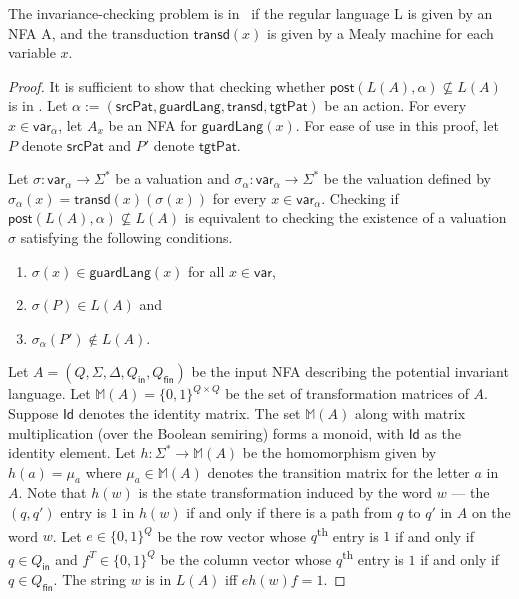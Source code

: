 \documentclass[12pt, a4paper]{article}
\newcommand{\var}{\textsf{var}}
\newcommand{\T}{\textsf{transd}}
\newcommand{\post}{\textsf{post}}
\newcommand{\ssub}{\sigma} %
\newcommand{\spat}{\textsf{srcPat}}
\newcommand{\tpat}{\textsf{tgtPat}}
\newcommand{\guardL}{\textsf{guardLang}}
\newcommand{\alphabet}{\Sigma}
\renewcommand{\aut}{A}
\newcommand{\autinitial}{Q_\textsf{in}}
\newcommand{\auttrans}{\Delta}
\newcommand{\autfin}{Q_\textsf{fin}}
\newcommand{\Aut}{\aut}
\newcommand{\action}{\alpha}
\newcommand{\matrixSet}{\mathbb M}
\newcommand{\Id}{\textsf{Id}}
\begin{document}
\begin{theorem}
	The invariance-checking problem is in \psp\ if the regular language L is given by an NFA A, and the transduction $\T(x)$ is given by a
	Mealy machine for each variable $x$.
\end{theorem}
%
\begin{proof}
	It is sufficient to show that checking whether $\post(L(\Aut), \action) \not\subseteq L(\Aut)$ is in \psp. Let
	$\action := (\spat, \guardL, \T, \tpat)$ be an action. For every $x \in \var_\alpha$, let  $\Aut_x$ be an NFA for $\guardL(x)$. For ease
	of use in this proof, let $P$ denote $\spat$ and $P'$ denote $\tpat$. 
	
	Let  $\ssub: \var_\alpha \to \Sigma^\ast$ be a valuation and $\ssub_\alpha: \var_\alpha \to \Sigma^\ast$ be the valuation defined by
	$\ssub_\alpha(x) = \T(x)(\ssub(x))$ for every $x \in \var_\alpha$. Checking if $\post(L(\Aut), \action) \not\subseteq L(\Aut)$ is
	equivalent to checking the existence of a valuation $\ssub$ satisfying the following conditions.
  	\begin{enumerate}
  		\item $\ssub(x)\in \guardL(x) $ for all $x \in \var$,
 		\item $\ssub(P) \in L(\Aut)$ and
 		\item $\ssub_\alpha(P') \not\in L(\Aut)$.
 	\end{enumerate}
	
	Let $\Aut = (Q, \alphabet, \auttrans, \autinitial, \autfin)$ be the input NFA describing the potential invariant language. Let
	$\matrixSet(\Aut) = \{0,1\}^{Q \times Q}$ be the set of transformation matrices of $\Aut$. Suppose $\Id $ denotes the identity matrix.
	The set $\matrixSet(\Aut)$ along with matrix multiplication (over the Boolean semiring) forms a monoid, with $\Id$ as the identity
	element. Let $h: \Sigma^\ast \to \matrixSet(\Aut)$ be the homomorphism given by $h(a) = \mu_a$ where  $\mu_a \in \matrixSet(\Aut)$
	denotes the transition matrix for the letter $a$ in $\Aut$.  Note that $h(w)$ is the state transformation induced by the word
	$w$ --- the $(q, q')$ entry is $1$ in $h(w)$ if and only if there is a path from $q$ to $q'$ in $\Aut$ on the word $w$. Let
	$e \in \{0,1\}^Q$ be the  row vector whose $q$\textsuperscript{th} entry is $1$ if and only if $q \in Q_\textsf{in}$ and
	$f^T \in \{0,1\}^Q$ be the column vector whose $q$\textsuperscript{th} entry is $1$ if and only if $q \in Q_\textsf{fin}$. The string
	$w$ is in $L(\Aut)$ iff $eh(w) f =1$.
	

\end{proof}
\end{document}
